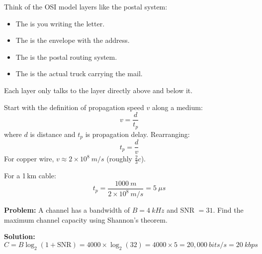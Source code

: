 \documentclass[main.tex]{subfiles}
\begin{document}
\vspace{6pt}

\begin{infobox}
Think of the OSI model layers like the postal system:
\begin{itemize}
    \item The  is you writing the letter.
    \item The  is the envelope with the address.
    \item The  is the postal routing system.
    \item The  is the actual truck carrying the mail.
\end{itemize}
Each layer only talks to the layer directly above and below it.
\end{infobox}

\vspace{6pt}

\begin{derivationbox}
Start with the definition of propagation speed $v$ along a medium:
\[
    v = \frac{d}{t_p}
\]
where $d$ is distance and $t_p$ is propagation delay. Rearranging:
\[
    t_p = \frac{d}{v}
\]
For copper wire, $v \approx 2 \times 10^8\ \unit{m/s}$ (roughly $\tfrac{2}{3}c$).

For a 1\,km cable:
\[
    t_p = \frac{1000\ \unit{m}}{2 \times 10^8\ \unit{m/s}} = 5\ \unit{\mu s}
\]
\end{derivationbox}

\vspace{6pt}

\begin{questionanswerbox}
\textbf{Problem:} A channel has a bandwidth of $B = 4\ \unit{kHz}$ and SNR $= 31$.
Find the maximum channel capacity using Shannon's theorem.

\medskip
\textbf{Solution:}
\[
    C = B \log_2(1 + \text{SNR})
      = 4000 \times \log_2(32)
      = 4000 \times 5
      = 20{,}000\ \unit{bits/s}
      = 20\ \unit{kbps}
\]
\end{questionanswerbox}

\vspace{4pt}
\end{document}
